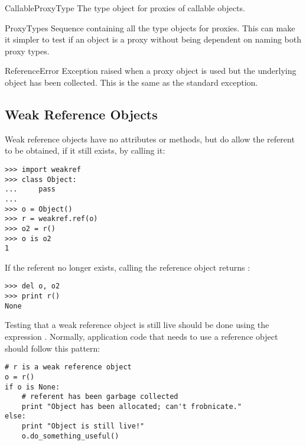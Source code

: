 \begin{datadesc}{CallableProxyType}
  The type object for proxies of callable objects.
\end{datadesc}

\begin{datadesc}{ProxyTypes}
  Sequence containing all the type objects for proxies.  This can make
  it simpler to test if an object is a proxy without being dependent
  on naming both proxy types.
\end{datadesc}

\begin{excdesc}{ReferenceError}
  Exception raised when a proxy object is used but the underlying
  object has been collected.  This is the same as the standard
   exception.
\end{excdesc}


\begin{seealso}
\end{seealso}


\subsection{Weak Reference Objects
            \label{weakref-objects}}

Weak reference objects have no attributes or methods, but do allow the
referent to be obtained, if it still exists, by calling it:

\begin{verbatim}
>>> import weakref
>>> class Object:
...     pass
...
>>> o = Object()
>>> r = weakref.ref(o)
>>> o2 = r()
>>> o is o2
1
\end{verbatim}

If the referent no longer exists, calling the reference object returns
:

\begin{verbatim}
>>> del o, o2
>>> print r()
None
\end{verbatim}

Testing that a weak reference object is still live should be done
using the expression .  Normally,
application code that needs to use a reference object should follow
this pattern:

\begin{verbatim}
# r is a weak reference object
o = r()
if o is None:
    # referent has been garbage collected
    print "Object has been allocated; can't frobnicate."
else:
    print "Object is still live!"
    o.do_something_useful()
\end{verbatim}

